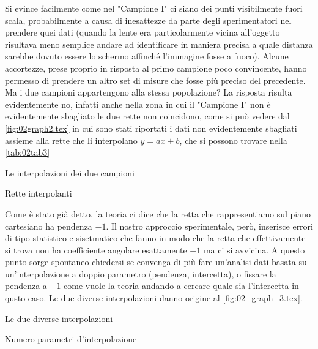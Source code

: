 Si evince facilmente come nel "Campione I" ci siano dei punti visibilmente fuori scala, probabilmente a causa di
 inesattezze da parte degli sperimentatori nel prendere quei dati (quando la lente era particolarmente vicina all'oggetto risultava
 meno semplice andare ad identificare in maniera precisa a quale distanza sarebbe dovuto essere lo schermo affinché l'immagine
 fosse a fuoco). Alcune accortezze, prese proprio in risposta al primo campione poco convincente, hanno permesso di prendere
 un altro set di misure che fosse più preciso del precedente. Ma i due campioni appartengono alla stessa popolazione? La risposta
 risulta evidentemente no, infatti anche nella zona in cui il "Campione I" non è evidentemente sbagliato le due rette non coincidono,
 come si può vedere dal \autoref{fig:02graph2.tex} in cui sono stati riportati i dati non evidentemente sbagliati assieme alla rette
 che li
 interpolano $y = ax + b$, che si possono trovare nella \autoref{tab:02tab3}
\begin{grafico} \centering  \caption{Le interpolazioni dei due campioni} \label{fig:02graph2.tex} \end{grafico}
\begin{tabella}
	\centering
	
	\caption{Rette interpolanti}
	\label{tab:02tab3}
\end{tabella}

Come è stato già detto, la teoria ci dice che la retta che rappresentiamo sul piano cartesiano ha pendenza $-1$. Il nostro approccio
 sperimentale, però, inserisce errori di tipo statistico e sisetmatico che fanno in modo che la retta che effettivamente si trova
 non ha coefficiente angolare esattamente $-1$ ma ci si avvicina. A questo punto sorge spontaneo chiedersi se convenga di più fare
 un'analisi dati basata su un'interpolazione a doppio parametro (pendenza, intercetta), o fissare la pendenza a $-1$ come vuole la
 teoria andando a cercare quale sia l'intercetta in qusto caso. Le due diverse interpolazioni danno origine al
 \autoref{fig:02_graph_3.tex}.
\begin{grafico} \centering  \caption{Le due diverse interpolazioni} \label{fig:02_graph_3.tex} \end{grafico}
\begin{tabella}
	\centering
	
	\caption{Numero parametri d'interpolazione}
	\label{tab:02tab4}
\end{tabella}


